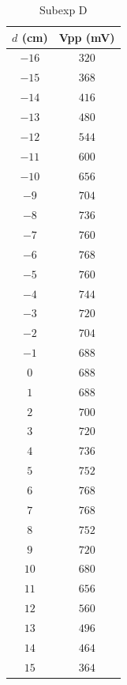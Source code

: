 \begin{table}[htb!]
\centering
\caption{Subexp D}
\begin{tabular}{cc}
\toprule
$d$ (\unit{\cm}) & Vpp (\unit{\mV}) \\
\midrule
$-16$ & $320$ \\
$-15$ & $368$ \\
$-14$ & $416$ \\
$-13$ & $480$ \\
$-12$ & $544$ \\
$-11$ & $600$ \\
$-10$ & $656$ \\
$-9$ & $704$ \\
$-8$ & $736$ \\
$-7$ & $760$ \\
$-6$ & $768$ \\
$-5$ & $760$ \\
$-4$ & $744$ \\
$-3$ & $720$ \\
$-2$ & $704$ \\
$-1$ & $688$ \\
$0$ & $688$ \\
$1$ & $688$ \\
$2$ & $700$ \\
$3$ & $720$ \\
$4$ & $736$ \\
$5$ & $752$ \\
$6$ & $768$ \\
$7$ & $768$ \\
$8$ & $752$ \\
$9$ & $720$ \\
$10$ & $680$ \\
$11$ & $656$ \\
$12$ & $560$ \\
$13$ & $496$ \\
$14$ & $464$ \\
$15$ & $364$ \\
\bottomrule
\end{tabular}
\end{table}

